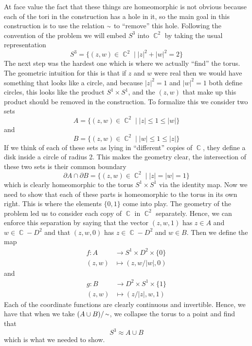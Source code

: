 \documentclass{article}
\DeclareMathOperator{\C}{\mathbb{C}}
\DeclareMathOperator{\suchthat}{\mathrel{|}}
\DeclareMathOperator{\mtilde}{{\raise.17ex\hbox{$\scriptstyle\mathtt{\sim}$}}}
\DeclareMathOperator{\lra}{\longrightarrow}
\begin{document}
At face value the fact that these things are homeomorphic is not obvious because each of the tori in the construction has a hole in it, so the main goal in this construction is to use the relation $\mtilde$ to ``remove'' this hole. Following the convention of the problem we will embed $S^3$ into $\C^2$ by taking the usual representation 
\[
S^3 = \{(z,w) \in \C^2 \suchthat |z|^2 + |w|^2 = 2\}
\]
The next step was the hardest one which is where we actually ``find'' the torus. The geometric intuition for this is that if $z$ and $w$ were real then we would have something that looks like a circle, and because $|z|^2 = 1$ and $|w|^2 = 1$ both define circles, this looks like the product $S^1 \times S^1$, and the $(z,w)$ that make up this product should be removed in the construction. To formalize this we consider two sets 
\[
A = \{(z,w) \in \C^2 \suchthat |z| \leq 1 \leq |w|\}
\]  
and
\[
B = \{(z,w) \in \C^2 \suchthat |w| \leq 1 \leq |z|\}
\]  
If we think of each of these sets as lying in ``different'' copies of $\C$, they define a disk inside a circle of radius 2. This makes the geometry clear, the intersection of these two sets is their common boundary
\[
\partial A \cap \partial B = \{(z,w) \in \C^2 \suchthat |z| = |w| = 1\}
\]
which is clearly homeomorphic to the torus $S^1 \times S^1$ via the identity map. Now we need to show that each of these parts is homeomorphic to the torus in its own right. This is where the elements $\{0,1\}$ come into play. The geometry of the problem led us to consider each copy of $\C$ in $\C^2$ separately. Hence, we can enforce this separation by saying that the vector $(z,w,1)$ has $z \in A$ and $w \in \C - D^2$ and that $(z,w,0)$ has $z \in \C - D^2$ and $w \in B$. Then we define the map 
\begin{align*}
f: A &\lra S^1 \times D^2 \times \{0\}\\
(z,w) &\mapsto (z, w/|w|, 0)
\end{align*}
and 
\begin{align*}
g: B &\lra D^2 \times S^1 \times \{1\} \\
(z,w)  &\mapsto (z/|z|, w, 1)
\end{align*}
Each of the coordinate functions are clearly continuous and invertible. Hence, we have that when we take $(A \cup B)/\mtilde$, we collapse the torus to a point and find that 
\[
S^3 \approx A \cup B
\]
which is what we needed to show. 
\end{document}
